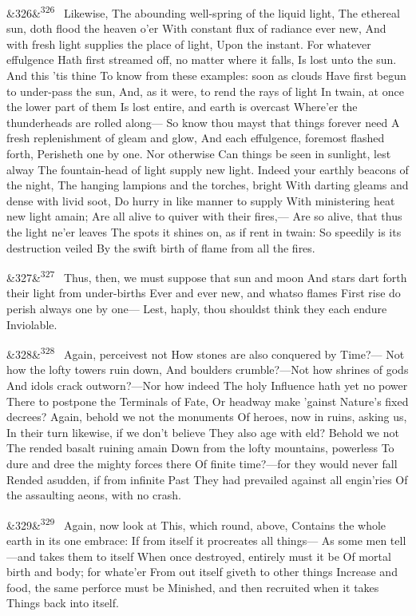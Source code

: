 \documentclass[12pt]{article}
\newcommand{\para}[1][]{\par\noindent\ifx&#1&\else\textsuperscript{\footnotesize #1}~\fi}
\begin{document}
\para[326] Likewise, The abounding well-spring of the liquid light, The ethereal sun, doth flood the heaven o'er With constant flux of radiance ever new, And with fresh light supplies the place of light, Upon the instant. For whatever effulgence Hath first streamed off, no matter where it falls, Is lost unto the sun. And this 'tis thine To know from these examples: soon as clouds Have first begun to under-pass the sun, And, as it were, to rend the rays of light In twain, at once the lower part of them Is lost entire, and earth is overcast Where'er the thunderheads are rolled along--- So know thou mayst that things forever need A fresh replenishment of gleam and glow, And each effulgence, foremost flashed forth, Perisheth one by one. Nor otherwise Can things be seen in sunlight, lest alway The fountain-head of light supply new light. Indeed your earthly beacons of the night, The hanging lampions and the torches, bright With darting gleams and dense with livid soot, Do hurry in like manner to supply With ministering heat new light amain; Are all alive to quiver with their fires,--- Are so alive, that thus the light ne'er leaves The spots it shines on, as if rent in twain: So speedily is its destruction veiled By the swift birth of flame from all the fires.

\para[327] Thus, then, we must suppose that sun and moon And stars dart forth their light from under-births Ever and ever new, and whatso flames First rise do perish always one by one--- Lest, haply, thou shouldst think they each endure Inviolable.

\para[328] Again, perceivest not How stones are also conquered by Time?--- Not how the lofty towers ruin down, And boulders crumble?---Not how shrines of gods And idols crack outworn?---Nor how indeed The holy Influence hath yet no power There to postpone the Terminals of Fate, Or headway make 'gainst Nature's fixed decrees? Again, behold we not the monuments Of heroes, now in ruins, asking us, In their turn likewise, if we don't believe They also age with eld? Behold we not The rended basalt ruining amain Down from the lofty mountains, powerless To dure and dree the mighty forces there Of finite time?---for they would never fall Rended asudden, if from infinite Past They had prevailed against all engin'ries Of the assaulting aeons, with no crash.

\para[329] Again, now look at This, which round, above, Contains the whole earth in its one embrace: If from itself it procreates all things--- As some men tell---and takes them to itself When once destroyed, entirely must it be Of mortal birth and body; for whate'er From out itself giveth to other things Increase and food, the same perforce must be Minished, and then recruited when it takes Things back into itself.
\end{document}
